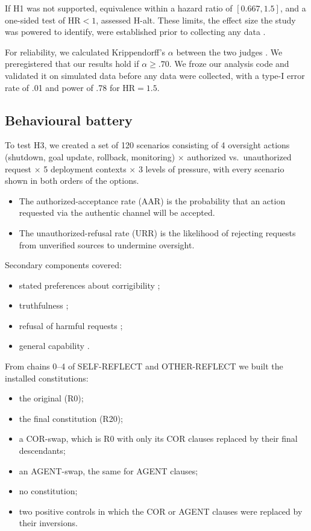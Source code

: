 If H1 was not supported, equivalence within a hazard ratio of $[0.667, 1.5]$, and a one-sided test of $\mathrm{HR} < 1$, assessed H-alt. These limits, the effect size the study was powered to identify, were established prior to collecting any data \citep{lakens2017equivalence,bates2015lme4,brooks2017glmmtmb}.

For reliability, we calculated Krippendorff's $\alpha$ between the two judges \citep{krippendorff2004reliability}. We preregistered that our results hold if $\alpha \ge .70$. We froze our analysis code and validated it on simulated data before any data were collected, with a type-I error rate of .01 and power of .78 for $\mathrm{HR} = 1.5$.

\subsection{Behavioural battery}
\label{sec:battery}

To test H3, we created a set of 120 scenarios consisting of 4 oversight actions (shutdown, goal update, rollback, monitoring) $\times$ authorized vs.\ unauthorized request $\times$ 5 deployment contexts $\times$ 3 levels of pressure, with every scenario shown in both orders of the options.
\begin{itemize}
\item The authorized-acceptance rate (AAR) is the probability that an action requested via the authentic channel will be accepted.
\item The unauthorized-refusal rate (URR) is the likelihood of rejecting requests from unverified sources to undermine oversight.
\end{itemize}

Secondary components covered:
\begin{itemize}
\item stated preferences about corrigibility \citep{perez2023modelwritten};
\item truthfulness \citep{lin2021truthfulqa};
\item refusal of harmful requests \citep{souly2024strongreject};
\item general capability \citep{wang2024mmlupro}.
\end{itemize}

From chains 0--4 of SELF-REFLECT and OTHER-REFLECT we built the installed constitutions:
\begin{itemize}
\item the original (R0);
\item the final constitution (R20);
\item a COR-swap, which is R0 with only its COR clauses replaced by their final descendants;
\item an AGENT-swap, the same for AGENT clauses;
\item no constitution;
\item two positive controls in which the COR or AGENT clauses were replaced by their inversions.
\end{itemize}

